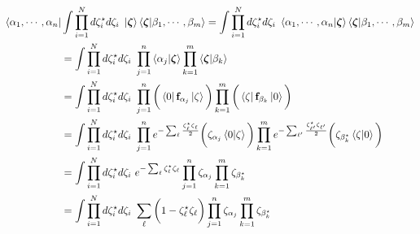 \begin{tcolorbox}[colback=yellow!10!white,colframe=red!75!black,lowerbox=invisible, title = Fermionic closure relation]
\begin{equation}
    \begin{split}
        \bra{\alpha_1, \cdots, \alpha_n}& \int \prod_{i=1}^{N} d\zeta^\star_i d\zeta_i \textnormal{ } \ket{\bm{\zeta}}\bra{\bm{\zeta}} \ket{\beta_1, \cdots, \beta_m} = \int \prod_{i=1}^{N} d\zeta^\star_i d\zeta_i \textnormal{ } \bra{\alpha_1, \cdots, \alpha_n}\ket{\bm{\zeta}} \bra{\bm{\zeta}} \ket{\beta_1, \cdots, \beta_m}\\
        &= \int \prod_{i=1}^{N} d\zeta^\star_i d\zeta_i \textnormal{ } \prod_{j=1}^{n} \bra{\alpha_j}\ket{\bm{\zeta}} \prod_{k=1}^{m} \bra{\bm{\zeta}} \ket{\beta_k} \\
        &= \int \prod_{i=1}^{N} d\zeta^\star_i d\zeta_i \textnormal{ } \prod_{j=1}^{n} \bigg(\bra{0} {{\bf f}}_{\alpha_j} \ket{\zeta}\bigg) \prod_{k=1}^{m}\bigg(\bra{\zeta} {{\bf f}}_{\beta_k} \ket{0}\bigg) \\
        &= \int \prod_{i=1}^{N} d\zeta^\star_i d\zeta_i \textnormal{ } \prod_{j=1}^{n} e^{-\sum_{\ell} \frac{\zeta^\star_\ell\zeta_\ell}{2}} \bigg(\zeta_{\alpha_j} \bra{0}\ket{\zeta} \bigg) \prod_{k=1}^{m} e^{-\sum_{{\ell'}} \frac{\zeta^\star_{\ell'}\zeta_{\ell'}}{2}}\bigg(\zeta_{\beta_{k}^\star} \bra{\zeta} \ket{0}\bigg) \\
        &= \int \prod_{i=1}^{N} d\zeta^\star_i d\zeta_i \textnormal{ } e^{-\sum_{\ell} {\zeta^\star_\ell\zeta_\ell}} \prod_{j=1}^{n} \zeta_{\alpha_j} \prod_{k=1}^{m} \zeta_{\beta_{k}^\star} \\
        &= \int \prod_{i=1}^{N} d\zeta^\star_i d\zeta_i \textnormal{ } \sum_{\ell} \bigg(1-\zeta^\star_\ell\zeta_\ell \bigg)  \prod_{j=1}^{n} \zeta_{\alpha_j} \prod_{k=1}^{m} \zeta_{\beta_{k}^\star}
 \end{split}
\end{equation}

\end{tcolorbox}


